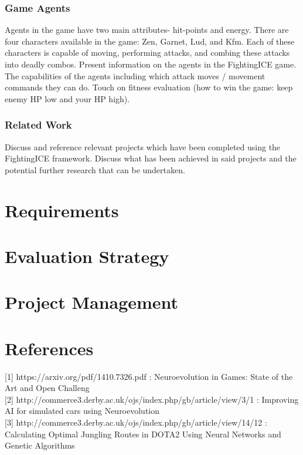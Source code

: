 \documentclass[11pt,a4paper]{article}
\begin{document}
\subsubsection{Game Agents}
Agents in the game have two main attributes- hit-points and energy. There are four characters available in the game: Zen, Garnet, Lud, and Kfm. Each of these characters is capable of moving, performing attacks, and combing these attacks into deadly combos. 
Present information on the agents in the FightingICE game. The capabilities of the agents including which attack moves / movement commands they can do. Touch on fitness evaluation (how to win the game: keep enemy HP low and your HP high).\\


\subsubsection{Related Work}
Discuss and reference relevant projects which have been completed using the FightingICE framework. Discuss what has been achieved in said projects and the potential further research that can be undertaken.

\newpage
\section{Requirements}

\section{Evaluation Strategy}

\section{Project Management}

\section{References}

[1] https://arxiv.org/pdf/1410.7326.pdf : Neuroevolution in Games: State of the Art and Open Challeng\\

[2] http://commerce3.derby.ac.uk/ojs/index.php/gb/article/view/3/1 : Improving AI for simulated cars using Neuroevolution\\

[3] http://commerce3.derby.ac.uk/ojs/index.php/gb/article/view/14/12 : Calculating Optimal Jungling Routes in DOTA2 Using Neural Networks and Genetic Algorithms\\
\end{document}

